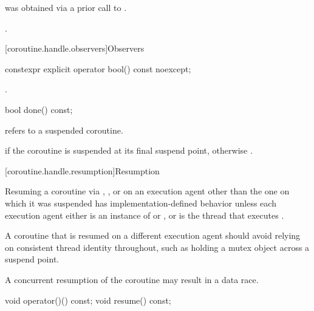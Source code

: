 \begin{itemdescr}
\pnum
\expects
{} was obtained via a prior call to .

\pnum
\ensures
{}.
\end{itemdescr}

[coroutine.handle.observers]{Observers}

%
\begin{itemdecl}
constexpr explicit operator bool() const noexcept;
\end{itemdecl}

\begin{itemdescr}
\pnum
\returns
{}.
\end{itemdescr}

%
\begin{itemdecl}
bool done() const;
\end{itemdecl}

\begin{itemdescr}
\pnum
\expects
{} refers to a suspended coroutine.

\pnum
\returns
{} if the coroutine is suspended at its
final suspend point, otherwise .
\end{itemdescr}

[coroutine.handle.resumption]{Resumption}

\pnum
Resuming a coroutine via , , or 
on an execution agent other than the one on which it was suspended
has implementation-defined behavior unless
each execution agent either is
an instance of  or ,
or is the thread that executes .
\begin{note}
A coroutine that is resumed on a different execution agent should
avoid relying on consistent thread identity throughout, such as holding
a mutex object across a suspend point.
\end{note}
\begin{note}
A concurrent resumption of the coroutine may result in a data race.
\end{note}

%
%
\begin{itemdecl}
void operator()() const;
void resume() const;
\end{itemdecl}

